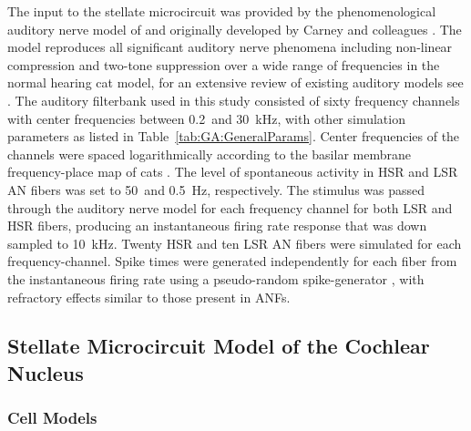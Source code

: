 The input to the stellate microcircuit was provided by the
phenomenological auditory nerve model of \citet{HeinzZhangEtAl:2001}
and originally developed by Carney and colleagues
\citep{Carney:1993,ZhangCarney:2001}. The model reproduces all
significant auditory nerve phenomena including non-linear compression
and two-tone suppression over a wide range of frequencies in the
normal hearing cat model, for an extensive review of existing auditory
models see \citet{Lopez-Poveda:2005}. The auditory filterbank used in
this study consisted of sixty frequency channels with center
frequencies between 0.2~and 30~kHz, with other simulation parameters
as listed in Table~\ref{tab:GA:GeneralParams}. Center frequencies of the channels
were spaced logarithmically according to the basilar membrane
frequency-place map of cats \citep{Greenwood:1990}. The level of
spontaneous activity in HSR and LSR AN fibers was set to 50~and
0.5~Hz, respectively. The stimulus was passed through the auditory
nerve model for each frequency channel for both LSR and HSR fibers,
producing an instantaneous firing rate response that was down sampled
to 10~kHz. Twenty HSR and ten LSR AN fibers were simulated for each
frequency-channel. Spike times were generated independently for each
fiber from the instantaneous firing rate using a pseudo-random
spike-generator \citep{JacksonCarney:2005}, with refractory effects
similar to those present in ANFs.

\subsection{Stellate Microcircuit Model of the Cochlear Nucleus}\label{sec:GA:stell-micr-model}

\subsubsection{Cell Models}\label{sec:GA:cell-models}

